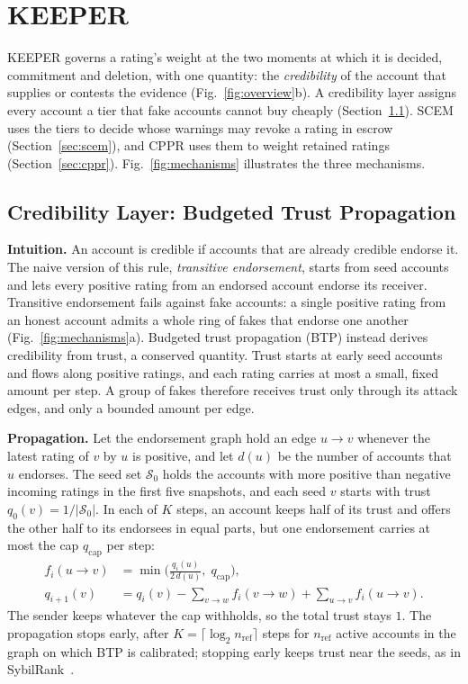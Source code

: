 \documentclass[lettersize,journal]{IEEEtran}
\begin{document}
\section{KEEPER}
\label{sec:keeper}

KEEPER governs a rating's weight at the two moments at which it is decided, commitment and deletion, with one quantity: the \emph{credibility} of the account that supplies or contests the evidence (Fig.~\ref{fig:overview}b).
A credibility layer assigns every account a tier that fake accounts cannot buy cheaply (Section~\ref{sec:btp}).
SCEM uses the tiers to decide whose warnings may revoke a rating in escrow (Section~\ref{sec:scem}), and CPPR uses them to weight retained ratings (Section~\ref{sec:cppr}).
Fig.~\ref{fig:mechanisms} illustrates the three mechanisms.

\subsection{Credibility Layer: Budgeted Trust Propagation}
\label{sec:btp}

\noindent\textbf{Intuition.}
An account is credible if accounts that are already credible endorse it.
The naive version of this rule, \emph{transitive endorsement}, starts from seed accounts and lets every positive rating from an endorsed account endorse its receiver.
Transitive endorsement fails against fake accounts: a single positive rating from an honest account admits a whole ring of fakes that endorse one another (Fig.~\ref{fig:mechanisms}a).
Budgeted trust propagation (BTP) instead derives credibility from trust, a conserved quantity.
Trust starts at early seed accounts and flows along positive ratings, and each rating carries at most a small, fixed amount per step. A group of fakes therefore receives trust only through its attack edges, and only a bounded amount per edge.

\smallskip\noindent\textbf{Propagation.}
Let the endorsement graph hold an edge $u \to v$ whenever the latest rating of $v$ by $u$ is positive, and let $d(u)$ be the number of accounts that $u$ endorses.
The seed set $\mathcal{S}_0$ holds the accounts with more positive than negative incoming ratings in the first five snapshots, and each seed $v$ starts with trust $q_0(v) = 1/|\mathcal{S}_0|$.
In each of $K$ steps, an account keeps half of its trust and offers the other half to its endorsees in equal parts, but one endorsement carries at most the cap $q_{\mathrm{cap}}$ per step:
\begin{equation}
\label{eq:btp}
\begin{aligned}
f_i(u \to v) &= \min\!\Big(\frac{q_i(u)}{2\,d(u)},\; q_{\mathrm{cap}}\Big), \\
q_{i+1}(v) &= q_i(v) - \sum_{v \to w} f_i(v \to w) + \sum_{u \to v} f_i(u \to v).
\end{aligned}
\end{equation}
The sender keeps whatever the cap withholds, so the total trust stays $1$.
The propagation stops early, after $K = \lceil \log_2 n_{\mathrm{ref}} \rceil$ steps for $n_{\mathrm{ref}}$ active accounts in the graph on which BTP is calibrated; stopping early keeps trust near the seeds, as in SybilRank~\cite{cao2012aiding}.
\end{document}
